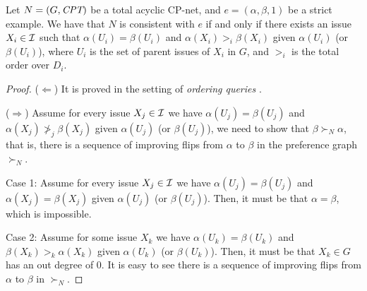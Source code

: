 \begin{lem}
\label{lem:cp}
Let $N=(G,\textit{CPT})$ be a total acyclic CP-net, and $e=(\alpha,\beta,1)$ be a strict example.
We have that $N$ is consistent with $e$ if and only if there exists an issue $X_i \in \mathcal{I}$
such that $\alpha(U_i)=\beta(U_i)$ and $\alpha(X_i) >_i \beta(X_i)$ given $\alpha(U_i)$ 
(or $\beta(U_i)$),
where $U_i$ is the set of parent issues of $X_i$ in $G$, and $>_i$ is the total order over
$D_i$.
\end{lem}
\begin{proof}
	($\Leftarrow$) It is proved in the setting of \emph{ordering queries} \cite{bbdh03}.

	($\Rightarrow$) Assume for every issue $X_j \in \mathcal{I}$ we have $\alpha(U_j)=\beta(U_j)$ and
	$\alpha(X_j) \not >_j \beta(X_j)$ given $\alpha(U_j)$ (or $\beta(U_j)$), we need to
	show that $\beta \succ_N \alpha$, that is, there is a sequence of improving flips
	from $\alpha$ to $\beta$ in the preference graph $\succ_N$.

	Case 1: Assume for every issue $X_j \in \mathcal{I}$ we have $\alpha(U_j)=\beta(U_j)$ and 
	$\alpha(X_j) = \beta(X_j)$ given $\alpha(U_j)$ (or $\beta(U_j)$).
	Then, it must be that $\alpha=\beta$, which is impossible.

	Case 2: Assume for some issue $X_k$ we have $\alpha(U_k)=\beta(U_k)$ and
	$\beta(X_k) >_k \alpha(X_k)$ given $\alpha(U_k)$ (or $\beta(U_k)$).
	Then, it must be that $X_k \in G$ has an out degree of 0.
	It is easy to see there is a sequence of improving flips from $\alpha$ to $\beta$ in $\succ_N$.
\end{proof}

